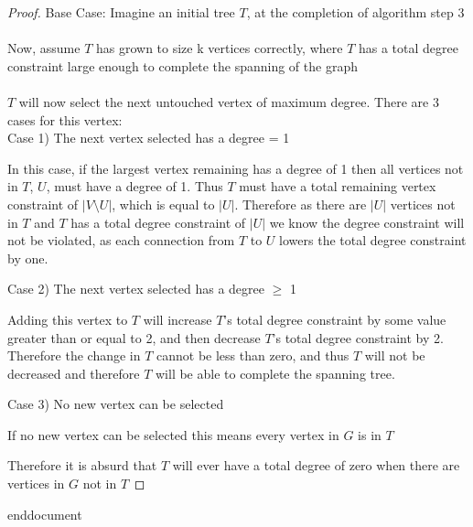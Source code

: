 \documentclass{article}
\begin{document}
\begin{proof}
Base Case: Imagine an initial tree $T$, at the completion of algorithm step 3
\\
\\
Now, assume $T$ has grown to size k vertices correctly, where $T$ has a total degree constraint large enough to complete the spanning of the graph
\\\\
$T$ will now select the next untouched vertex of maximum degree. There are 3 cases for this vertex:
\\

    \setlength\parindent{12pt} 
    Case 1) The next vertex selected has a degree = 1 \par
        \setlength\parindent{24pt}\hangindent=24pt 
        In this case, if the largest vertex remaining has a degree of 1 then all vertices not in $T$, $U$, must
        have a degree of 1. Thus $T$ must have a total remaining vertex constraint of $|V \setminus U|$, which is equal to  $|U|$. Therefore as there are $|U|$ vertices not in $T$ and $T$ has a total degree constraint of $|U|$ we know the degree constraint will not be violated, as each connection from $T$ to $U$ lowers the total degree constraint by one.
        \par
        
    \setlength\parindent{12pt}
    Case 2) The next vertex selected has a degree $\geq$ 1\par
        \setlength\parindent{24pt}\hangindent=24pt 
        Adding this vertex to $T$ will increase $T$'s total degree constraint by some value greater than or equal to 2, and then decrease $T$'s total degree constraint by 2.
        Therefore the change in $T$ cannot be less than zero, and thus $T$ will not be decreased and therefore $T$ will be able to complete the spanning tree.
        \par

    \setlength\parindent{12pt}
    Case 3) No new vertex can be selected\par
        \setlength\parindent{24pt}\hangindent=24pt 
        If no new vertex can be selected this means every vertex in $G$ is in $T$
        \par
        
    \setlength\parindent{0pt}\hangindent=0pt
    Therefore it is absurd that $T$ will ever have a total degree of zero when there are vertices in $G$ not in $T$

\end{proof}
end{document}
\end{document}
